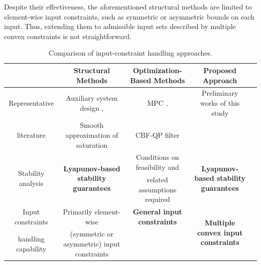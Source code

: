 \documentclass[letterpaper, journal]{IEEEtran}
\providecommand{\DIFaddend}{} %
\begin{document}
\DIFaddend Despite their effectiveness, the aforementioned structural methods are limited to element-wise input constraints, such as symmetric or asymmetric bounds on each input.
Thus, extending them to admissible input sets described by multiple convex constraints is not straightforward.



\begin{table}[t]
  \renewcommand{\arraystretch}{1.3}
  \caption{
    Comparison of input-constraint handling approaches.
  }
  \centering
  \begin{tabular}{c c c c c }
  \hline
  & 
  \textbf{Structural Methods} 
  & 
  \textbf{Optimization-Based Methods} 
  & 
  \textbf{Proposed Approach}
  \\
  \hline
  \hline %
    Representative 
  & 
  Auxiliary system design \cite{Gao:2017aa,Ma:2025aa,Gao:2026aa,Yang:2021aa,Jia:2020aa,Liu:2024aa,Liu:2025aa,Esfandiari:2014aa,Esfandiari:2015aa,Yu:2022aa,Rezaei:2025aa,He:2016aa,He:2019aa,Zhao:2016aa,Peng:2020aa},
  &
  MPC \cite{Greune:2011aa,Bemporad:1999aa,Berberich:2025aa,Draeger:1995aa,Vahidi-Moghaddam:2025aa,Mallick:2025aa,Khodaverdian:2025aa},
  &
  Preliminary works of this study
  \\
  literature
  &
  Smooth approximation of saturation \cite{Wang:2013aa,Cui:2014aa,Li:2024aa}
  &
  CBF-QP filter \cite{Ames:2019aa,Ko:2025aa,Sweatland:2025aa}
  &
  \cite{Ryu:2025ab,Ryu:2025aa}
  \\
  \hline %
  \multirow{2}{*}{
    Stability analysis 
  }
  & 
  \multirow{2}{*}{
    \textbf{Lyapunov-based stability guarantees}
  }
  & 
  Conditions on feasibility and
  & 
  \multirow{2}{*}{
    \textbf{Lyapunov-based stability guarantees}
  }
  \\
  &
  &
  related assumptions required
  &
  \\
  \hline %
  Input constraints 
  & 
  Primarily element-wise 
  & 
  \textbf{General input constraints}
  &
  \multirow{2}{*}{
  \textbf{Multiple convex input constraints}
  }
  \\
  handling capability
  &
  (symmetric or asymmetric) input constraints

\end{tabular}
\end{table}
\end{document}
